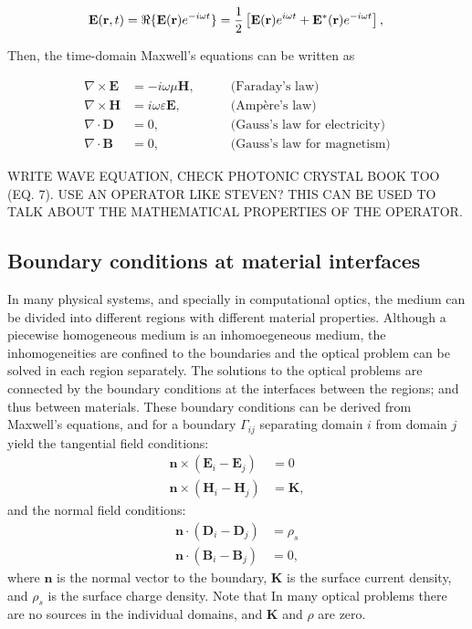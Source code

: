 \begin{equation}
    \mathbf{E}(\mathbf{r}, t) = \Re \{ \mathbf{E}(\mathbf{r}) e^{-i\omega t} \} = \frac{1}{2}\left[ \mathbf{E}(\mathbf{r}) e^{i\omega t} + \mathbf{E}^*(\mathbf{r}) e^{-i\omega t}\right], \label{eq:E_harmonic}\\
\end{equation}

Then, the time-domain Maxwell's equations can be written as

\begin{align}
    \nabla \times \mathbf{E} &= -i\omega \mu \mathbf{H}, \quad \quad &\text{(Faraday's law)} \label{eq:curlE_freq}\\
    \nabla \times \mathbf{H} &= i\omega \varepsilon \mathbf{E}, \quad \quad &\text{(Ampère's law)} \label{eq:curlH_freq}\\
    \nabla \cdot \mathbf{D} &= 0, \quad \quad &\text{(Gauss's law for electricity)} \label{eq:divD_freq}\\
    \nabla \cdot \mathbf{B} &= 0, \quad \quad &\text{(Gauss's law for magnetism)} \label{eq:divB_freq}
\end{align}

WRITE WAVE EQUATION, CHECK PHOTONIC CRYSTAL BOOK TOO (EQ. 7). USE AN OPERATOR LIKE STEVEN? 
THIS CAN BE USED TO TALK ABOUT THE MATHEMATICAL PROPERTIES OF THE OPERATOR.

\subsection*{Boundary conditions at material interfaces}

In many physical systems, and specially in computational optics, the medium can be divided
into different regions with different material properties. Although a piecewise homogeneous
medium is an inhomoegeneous medium, the inhomogeneities are confined to the boundaries and 
the optical problem can be solved in each region separately. The solutions to the optical problems
are connected by the boundary conditions at the interfaces between the regions; and thus between
materials. These boundary conditions can be derived from Maxwell's equations, and for a boundary
$\Gamma_{ij}$ separating domain $i$ from domain $j$ yield the tangential field conditions:
\begin{align}
    \mathbf{n} \times (\mathbf{E}_i - \mathbf{E}_j) &= 0 \label{eq:BC_E}\\
    \mathbf{n} \times (\mathbf{H}_i - \mathbf{H}_j) &= \mathbf{K} , \label{eq:BC_H}
\end{align} 
and the normal field conditions:
\begin{align}
    \mathbf{n} \cdot (\mathbf{D}_i - \mathbf{D}_j) &= \rho_s \label{eq:BC_D}\\
    \mathbf{n} \cdot (\mathbf{B}_i - \mathbf{B}_j) &= 0, \label{eq:BC_B}
\end{align}
where $\mathbf{n}$ is the normal vector to the boundary, $\mathbf{K}$ is the surface current density,
 and $\rho_s$ is the surface charge density. Note that In many optical problems there are no 
 sources in the individual domains, and $\mathbf{K}$ and $\rho$ are zero.

